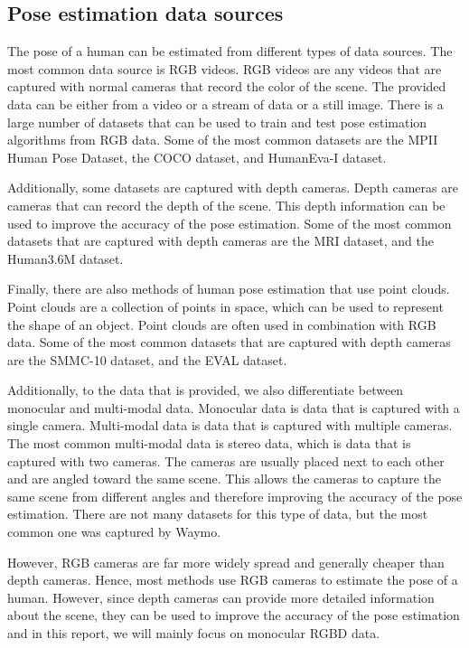 \subsection{Pose estimation data sources}

The pose of a human can be estimated from different types of data sources. The most common data source is RGB videos. RGB videos are any videos that are captured with normal cameras that record the color of the scene. The provided data can be either from a video or a stream of data or a still image. There is a large number of datasets that can be used to train and test pose estimation algorithms from RGB data. Some of the most common datasets are the MPII Human Pose Dataset\cite{MPII}, the COCO dataset\cite{Coco}, and HumanEva-I dataset\cite{HumanEva-I}.

Additionally, some datasets are captured with depth cameras. Depth cameras are cameras that can record the depth of the scene. This depth information can be used to improve the accuracy of the pose estimation. Some of the most common datasets that are captured with depth cameras are the MRI dataset\cite{mRI}, and the Human3.6M dataset\cite{h36m_pami}.

Finally, there are also methods of human pose estimation that use point clouds. Point clouds are a collection of points in space, which can be used to represent the shape of an object. Point clouds are often used in combination with RGB data. Some of the most common datasets that are captured with depth cameras are the SMMC-10 dataset\cite{SMMC10}, and the EVAL dataset\cite{EVAL}.

Additionally, to the data that is provided, we also differentiate between monocular and multi-modal data. Monocular data is data that is captured with a single camera. Multi-modal data is data that is captured with multiple cameras. The most common multi-modal data is stereo data, which is data that is captured with two cameras. The cameras are usually placed next to each other and are angled toward the same scene. This allows the cameras to capture the same scene from different angles and therefore improving the accuracy of the pose estimation. There are not many datasets for this type of data, but the most common one was captured by Waymo\cite{Waymo}.

However, RGB cameras are far more widely spread and generally cheaper than depth cameras. Hence, most methods use RGB cameras to estimate the pose of a human. However, since depth cameras can provide more detailed information about the scene, they can be used to improve the accuracy of the pose estimation and in this report, we will mainly focus on monocular RGBD data.

